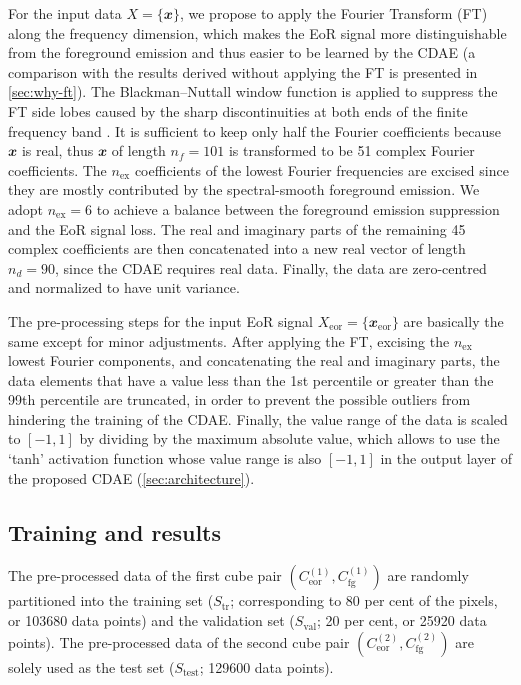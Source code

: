 \documentclass[fleqn,usenatbib]{mnras}
\newcommand{\R}[1]{\mathrm{#1}}
\newcommand{\B}[1]{\mathbfit{#1}}
\begin{document}
For the input data $X = \{\B{x}\}$, we propose to apply the
Fourier Transform (FT) along the frequency dimension,
which makes the EoR signal more distinguishable from the
foreground emission and thus easier to be learned by the CDAE
(a comparison with the results derived without applying the FT is
presented in \autoref{sec:why-ft}).
The Blackman--Nuttall window function is applied to suppress the
FT side lobes caused by the sharp discontinuities at both ends
of the finite frequency band \citep[e.g.,][]{chapman2016}.
It is sufficient to keep only half the Fourier coefficients because
$\B{x}$ is real, thus $\B{x}$ of length $n_f = 101$ is transformed to
be 51 complex Fourier coefficients.
The $n_{\R{ex}}$ coefficients of the lowest Fourier frequencies are
excised since they are mostly contributed by the spectral-smooth
foreground emission.
We adopt $n_{\R{ex}} = 6$ to achieve a balance between the
foreground emission suppression and the EoR signal loss.
The real and imaginary parts of the remaining 45 complex coefficients
are then concatenated into a new real vector of length $n_d = 90$,
since the CDAE requires real data.
Finally, the data are zero-centred and normalized to have unit variance.

The pre-processing steps for the input EoR signal
$X_{\R{eor}} = \{\B{x}_{\R{eor}}\}$
are basically the same except for minor adjustments.
After applying the FT, excising the $n_{\R{ex}}$ lowest Fourier
components, and concatenating the real and imaginary parts,
the data elements that have a value less than the 1st
percentile or greater than the 99th percentile are truncated,
in order to prevent the possible outliers from hindering the training of
the CDAE.
Finally, the value range of the data is scaled to $[-1, 1]$ by
dividing by the maximum absolute value,
which allows to use the `tanh' activation function whose value range
is also $[-1, 1]$ in the output layer of the proposed CDAE
(\autoref{sec:architecture}).


\subsection{Training and results}
\label{sec:results}

The pre-processed data of the first cube pair
$\left( C_{\R{eor}}^{(1)}, C_{\R{fg}}^{(1)} \right)$
are randomly partitioned into the training set ($S_{\R{tr}}$; corresponding
to 80 per cent of the pixels, or \num{103680} data points) and the
validation set ($S_{\R{val}}$; 20 per cent, or \num{25920} data points).
The pre-processed data of the second cube pair
$\left( C_{\R{eor}}^{(2)}, C_{\R{fg}}^{(2)} \right)$
are solely used as the test set ($S_{\R{test}}$; \num{129600} data points).
\end{document}
